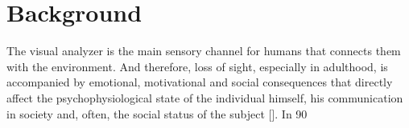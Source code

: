 \documentclass[twocolumn]{article}
\date{}
\begin{document}
\section {Background}
\par The visual analyzer is the main sensory channel for humans that connects them with the environment. And therefore, loss of sight, especially in adulthood, is accompanied by emotional, motivational and social consequences that directly affect the psychophysiological state of the individual himself, his communication in society and, often, the social status of the subject [\cite{bib1}]. In 90%
\end{document}
